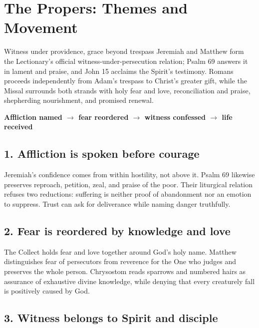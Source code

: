 \section*{The Propers: Themes and Movement}

\begin{massbox}{Witness under providence, grace beyond trespass}
Jeremiah and Matthew form the Lectionary's official witness-under-persecution relation; Psalm 69 answers it in lament and praise, and John 15 acclaims the Spirit's testimony. Romans proceeds independently from Adam's trespass to Christ's greater gift, while the Missal surrounds both strands with holy fear and love, reconciliation and praise, shepherding nourishment, and promised renewal.
\end{massbox}

\begin{center}
\textbf{Affliction named $\longrightarrow$ fear reordered $\longrightarrow$ witness confessed $\longrightarrow$ life received}
\end{center}

\subsection*{1. Affliction is spoken before courage\enspace{}}

Jeremiah's confidence comes from within hostility, not above it. Psalm 69 likewise preserves reproach, petition, zeal, and praise of the poor. Their liturgical relation refuses two reductions: suffering is neither proof of abandonment nor an emotion to suppress. Trust can ask for deliverance while naming danger truthfully.

\subsection*{2. Fear is reordered by knowledge and love\enspace{}}

The Collect holds fear and love together around God's holy name. Matthew distinguishes fear of persecutors from reverence for the One who judges and preserves the whole person. Chrysostom reads sparrows and numbered hairs as assurance of exhaustive divine knowledge, while denying that every creaturely fall is positively caused by God.

\subsection*{3. Witness belongs to Spirit and disciple\enspace{}}

